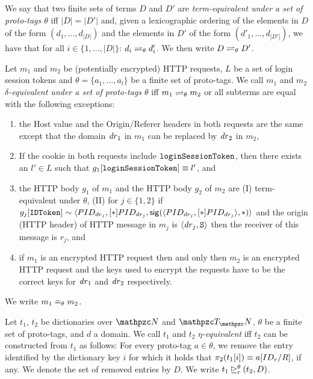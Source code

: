 \begin{theorem}
\begin{definition}
    We say that two finite sets of terms $D$ and $D'$ are
    \emph{term-equivalent under a set of proto-tags $\theta$} iff
    $|D| = |D'|$ and, given a lexicographic ordering of the elements in
    $D$ of the form $(d_1,\dots,d_{|D|})$ and the elements in $D'$ of
    the form $(d'_1,\dots,d_{|D'|})$, we have that for all
    $i \in \{1,\dots,|D|\}$: $d_i \prototagequiv{\theta} d'_i$. We then
    write $D \prototagequiv{\theta} D'$.
  \end{definition}
  
  \begin{definition}
    Let $m_1$ and $m_2$ be (potentially encrypted) HTTP requests, 
    $L$ be a set of login session tokens and
    $\theta = \{a_1, \ldots, a_l \}$ be a finite set of proto-tags. 
    We call $m_1$ and $m_2$ \emph{$\delta$-equivalent under a set of proto-tags $\theta$} 
    iff $m_1 \prototagequiv{\theta} m_2$ or all subterms are equal with the following exceptions:
    \begin{enumerate}
    \item the Host value and the Origin/Referer headers in both requests
      are the same except that the domain $\mi{dr}_1$ in $m_1$ can be
      replaced by $\mi{dr}_2$ in $m_2$,
    \item If the cookie in both requests include $\str{loginSessionToken}$, 
      then there exists an $l' \in L$ such that $g_1[\str{loginSessionToken}] \equiv l'$, and
    \item the HTTP body $g_1$ of $m_1$ and the HTTP body $g_2$ of $m_2$
      are (I) term-equivalent under $\theta$, 
      (II) for $j\in \{1,2\}$ if
      $g_j[\str{IDToken}] \sim \myangle{PID_{dr_j}, [*]PID_{dr_j}, 
      \sig{\myangle{PID_{dr_j}, [*]PID_{dr_j}}}{*}}$
      and the origin (HTTP header) of HTTP message in $m_j$ is
      $\an{\mi{dr}_j,\https}$ then the receiver of this message is
      $r_j$, and 
    \item if $m_1$ is an encrypted HTTP request then and only then $m_2$
      is an encrypted HTTP request and the keys used to encrypt the
      requests have to be the correct keys for $\mi{dr}_1$ and
      $\mi{dr}_2$ respectively.
    \end{enumerate}
    We write $m_1 \httptagequiv{\theta} m_2$.
  \end{definition}
  
  \begin{definition}
    Let $t_1$, $t_2$ be dictionaries over $\nonces$ and $\terms$,
    $\theta$ be a finite set of proto-tags, and $d$ a domain. We call
    $t_1$ and $t_2$ \emph{$\eta$-equivalent} iff $t_2$ can be
    constructed from $t_1$ as follows: For every proto-tag
    $a \in \theta$, we remove the entry identified by the dictionary key
    $i$ for which it holds that $\proj{2}{t_1[i]} \equiv a[ID_r/ R]$, if
    any. We denote the set of removed entries by $D$. We write
    $\logsessminus{t_1}{t_2}{\theta}{r}{D}$.
  \end{definition}
  

\end{theorem}
